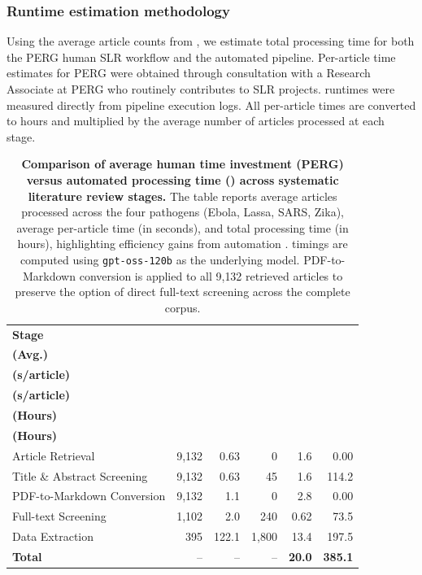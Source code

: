 \subsubsection*{Runtime estimation methodology}
Using the average article counts from , we estimate total processing time for both the PERG human SLR workflow and the \name{} automated pipeline. Per-article time estimates for PERG were obtained through consultation with a Research Associate at PERG who routinely contributes to SLR projects. \name{} runtimes were measured directly from pipeline execution logs. All per-article times are converted to hours and multiplied by the average number of articles processed at each stage.

\begin{table}[H]
\footnotesize
\centering
\caption{\textbf{Comparison of average human time investment (PERG) versus automated processing time (\name{}) across systematic literature review stages.}
The table reports average articles processed across the four pathogens (Ebola, Lassa, SARS, Zika), average per-article time (in seconds), and total processing time (in hours), highlighting efficiency gains from automation .\name{} timings are computed using \texttt{gpt-oss-120b} as the underlying model. PDF-to-Markdown conversion is applied to all 9{,}132 retrieved articles to preserve the option of direct full-text screening across the complete corpus.}
\label{tab:perg_vs_\name{}_runtime}

\renewcommand{\arraystretch}{1.15}
\begin{tabular}{l|r|rr|rr}
\toprule
\textbf{Stage} 
& \makecell{\textbf{Articles}\\\textbf{(Avg.)}} 
& \makecell{\textbf{\name{}}\\\textbf{(s/article)}} 
& \makecell{\textbf{PERG}\\\textbf{(s/article)}} 
& \makecell{$\overline{\textbf{\name{}}}$\\\textbf{(Hours)}} 
& \makecell{$\overline{\textbf{PERG}}$\\\textbf{(Hours)}} \\
\midrule
Article Retrieval 
& 9{,}132 
& 0.63 
& 0 
& 1.6 
& 0.00 \\
Title \& Abstract Screening 
& 9{,}132 
& 0.63 
& 45 
& 1.6 
& 114.2 \\
PDF-to-Markdown Conversion 
& 9{,}132 
& 1.1 
& 0 
& 2.8 
& 0.00 \\
Full-text Screening 
& 1{,}102 
& 2.0 
& 240 
& 0.62 
& 73.5 \\
Data Extraction 
& 395 
& 122.1 
& 1{,}800 
& 13.4 
& 197.5 \\
\midrule
\textbf{Total} 
& -- 
& -- 
& -- 
& \textbf{20.0} 
& \textbf{385.1} \\
\bottomrule
\end{tabular}
\end{table}

